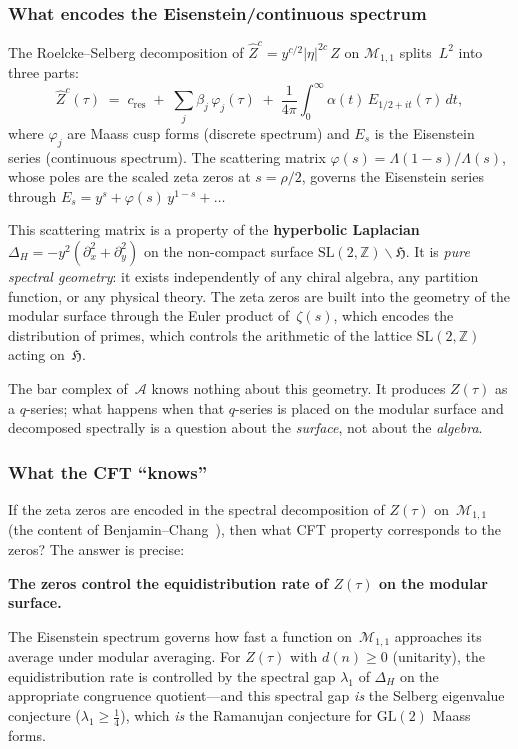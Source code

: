 \documentclass[11pt]{article}
\newcommand{\cA}{\mathcal{A}}
\newcommand{\cM}{\mathcal{M}}
\providecommand{\bZ}{\mathbb{Z}}
\begin{document}
\subsubsection{What encodes the Eisenstein/continuous spectrum}

The Roelcke--Selberg decomposition of $\hat Z^c =
y^{c/2}|\eta|^{2c}\,Z$ on $\cM_{1,1}$ splits~$L^2$ into
three parts:
\[
  \hat Z^c(\tau)
  \;=\;
  c_{\mathrm{res}}
  \;+\;
  \sum_j \beta_j\,\varphi_j(\tau)
  \;+\;
  \frac{1}{4\pi}\int_0^\infty
  \alpha(t)\,E_{1/2+it}(\tau)\,dt,
\]
where $\varphi_j$ are Maass cusp forms (discrete spectrum)
and $E_s$ is the Eisenstein series (continuous spectrum).  The
scattering matrix
$\varphi(s) = \Lambda(1{-}s)/\Lambda(s)$,
whose poles are the scaled zeta zeros at $s = \rho/2$, governs
the Eisenstein series through
$E_s = y^s + \varphi(s)\,y^{1-s} + \ldots$

This scattering matrix is a property of the
\textbf{hyperbolic Laplacian} $\Delta_H =
-y^2(\partial_x^2 + \partial_y^2)$ on the non-compact
surface $\mathrm{SL}(2,\bZ)\backslash\mathfrak{H}$.  It is
\emph{pure spectral geometry}: it exists independently of any
chiral algebra, any partition function, or any physical theory.
The zeta zeros are built into the geometry of the modular
surface through the Euler product of~$\zeta(s)$, which encodes
the distribution of primes, which controls the arithmetic of
the lattice $\mathrm{SL}(2,\bZ)$ acting on~$\mathfrak{H}$.

The bar complex of~$\cA$ knows nothing about this geometry.
It produces $Z(\tau)$ as a $q$-series; what happens when that
$q$-series is placed on the modular surface and decomposed
spectrally is a question about the \emph{surface}, not about
the \emph{algebra}.

\subsubsection{What the CFT ``knows''}

If the zeta zeros are encoded in the spectral decomposition
of $Z(\tau)$ on~$\cM_{1,1}$
(the content of Benjamin--Chang~\cite{BenjaminChang22}),
then what CFT property corresponds to the zeros?  The answer
is precise:

\textbf{The zeros control the equidistribution rate of
$Z(\tau)$ on the modular surface.}

The Eisenstein spectrum governs how fast a function
on~$\cM_{1,1}$ approaches its average under modular
averaging.  For $Z(\tau)$ with $d(n) \geq 0$ (unitarity),
the equidistribution rate is controlled by the spectral
gap $\lambda_1$ of $\Delta_H$ on the appropriate congruence
quotient---and this spectral gap \emph{is} the Selberg
eigenvalue conjecture ($\lambda_1 \geq \tfrac{1}{4}$),
which \emph{is} the Ramanujan conjecture for
$\mathrm{GL}(2)$ Maass forms.
\end{document}
